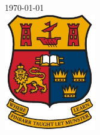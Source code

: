 \documentclass[12pt,a4paper,oneside,oldfontcommands]{memoir}
\begin{document}
\begin{page}


{\large \today}\\[2cm] %

\includegraphics[width=4cm]{images/ucc.jpeg}

\vfill %

\end{page}


\cleardoublepage
\end{document}
